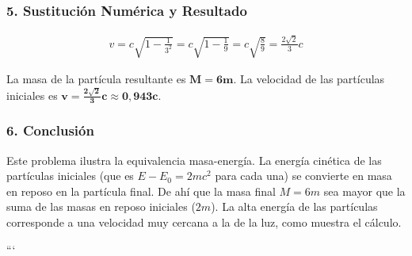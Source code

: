 \subsubsection*{5. Sustitución Numérica y Resultado}
\begin{gather}
    v = c\sqrt{1-\frac{1}{3^2}} = c\sqrt{1-\frac{1}{9}} = c\sqrt{\frac{8}{9}} = \frac{2\sqrt{2}}{3}c
\end{gather}
\begin{cajaresultado}
La masa de la partícula resultante es $\boldsymbol{M=6m}$. La velocidad de las partículas iniciales es $\boldsymbol{v = \frac{2\sqrt{2}}{3}c \approx 0,943c}$.
\end{cajaresultado}
\subsubsection*{6. Conclusión}
\begin{cajaconclusion}
Este problema ilustra la equivalencia masa-energía. La energía cinética de las partículas iniciales (que es $E-E_0 = 2mc^2$ para cada una) se convierte en masa en reposo en la partícula final. De ahí que la masa final $M=6m$ sea mayor que la suma de las masas en reposo iniciales ($2m$). La alta energía de las partículas corresponde a una velocidad muy cercana a la de la luz, como muestra el cálculo.
\end{cajaconclusion}
\newpage
```